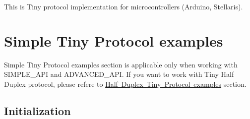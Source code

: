 This is Tiny protocol implementation for microcontrollers (Arduino, Stellaris).\hypertarget{arduino_arduino_tiny}{}\section{Simple Tiny Protocol examples}\label{arduino_arduino_tiny}
Simple Tiny Protocol examples section is applicable only when working with S\+I\+M\+P\+L\+E\+\_\+\+A\+PI and A\+D\+V\+A\+N\+C\+E\+D\+\_\+\+A\+PI. If you want to work with Tiny Half Duplex protocol, please refere to \mbox{\hyperlink{arduino_arduino_tiny_hd}{Half Duplex Tiny Protocol examples}} section.\hypertarget{arduino_arduino_tiny_init}{}\subsection{Initialization}\label{arduino_arduino_tiny_init}


